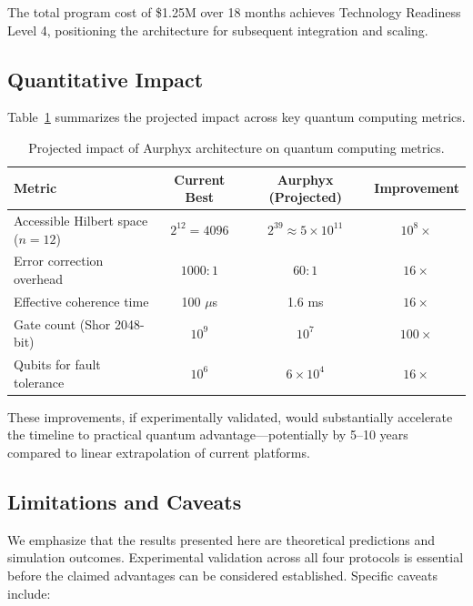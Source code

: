The total program cost of \$1.25M over 18 months achieves Technology Readiness Level 4, positioning the architecture for subsequent integration and scaling.

\subsection{Quantitative Impact}

Table~\ref{tab:impact_summary} summarizes the projected impact across key quantum computing metrics.

\begin{table}[h]
\caption{Projected impact of Aurphyx architecture on quantum computing metrics.}
\label{tab:impact_summary}
\begin{ruledtabular}
\begin{tabular}{lccc}
\textbf{Metric} & \textbf{Current Best} & \textbf{Aurphyx (Projected)} & \textbf{Improvement} \\
\hline
Accessible Hilbert space ($n = 12$) & $2^{12} = 4096$ & $2^{39} \approx 5 \times 10^{11}$ & $10^{8}\times$ \\
Error correction overhead & $1000:1$ & $60:1$ & $16\times$ \\
Effective coherence time & 100 $\mu$s & 1.6 ms & $16\times$ \\
Gate count (Shor 2048-bit) & $10^9$ & $10^7$ & $100\times$ \\
Qubits for fault tolerance & $10^6$ & $6 \times 10^4$ & $16\times$ \\
\end{tabular}
\end{ruledtabular}
\end{table}

These improvements, if experimentally validated, would substantially accelerate the timeline to practical quantum advantage—potentially by 5--10 years compared to linear extrapolation of current platforms.

\subsection{Limitations and Caveats}

We emphasize that the results presented here are theoretical predictions and simulation outcomes. Experimental validation across all four protocols is essential before the claimed advantages can be considered established. Specific caveats include:

